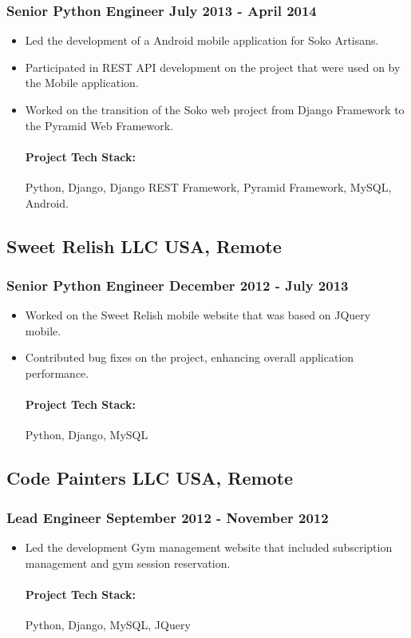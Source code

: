 \documentclass[11pt]{article} %
\begin{document}
\subsubsection{Senior Python Engineer \hfill  July 2013 - April 2014}
\begin{itemize}
    \item Led the development of a Android mobile application for Soko Artisans.
    \item Participated in REST API development on the project that were used on by the Mobile application.
    \item Worked on the transition of the Soko web project from Django Framework to the Pyramid Web Framework.

    \paragraph{Project Tech Stack:} Python, Django, Django REST Framework, Pyramid Framework, MySQL, Android.
\end{itemize}

\subsection{Sweet Relish LLC \hfill USA, Remote}
\subsubsection{Senior Python Engineer \hfill  December 2012 - July 2013}
\begin{itemize}
    \item Worked on the Sweet Relish mobile website that was based on JQuery mobile.
    \item Contributed bug fixes on the project, enhancing overall application performance.

    \paragraph{Project Tech Stack:} Python, Django, MySQL
\end{itemize}

\subsection{Code Painters LLC \hfill USA, Remote}
\subsubsection{Lead Engineer \hfill  September 2012 - November 2012}
\begin{itemize}
    \item Led the development Gym management website that included subscription management and gym session reservation.

    \paragraph{Project Tech Stack:} Python, Django, MySQL, JQuery
\end{itemize}
\end{document}
